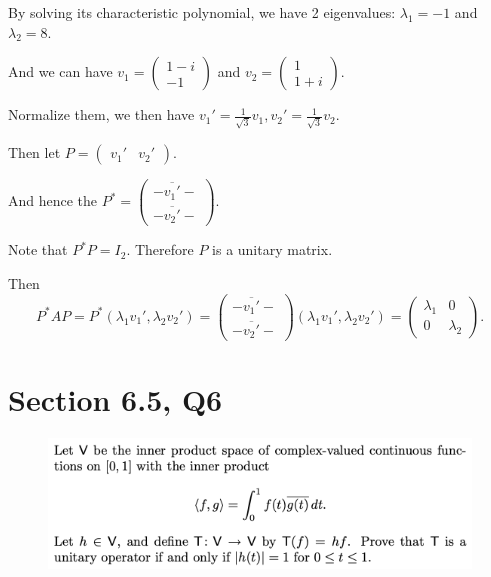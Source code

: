 \documentclass[12pt]{article}%
\begin{document}
By solving its characteristic polynomial, we have 2 eigenvalues: $\lambda_1=-1$ and $\lambda_2=8.$

And we can have $v_1=\begin{pmatrix} 1-i\\-1 \end{pmatrix}$ and 
$v_2=\begin{pmatrix} 1\\1+i \end{pmatrix}.$

Normalize them, we then have $v_1'=\frac{1}{\sqrt{3}}v_1,v_2'=\frac{1}{\sqrt{3}}v_2.$

Then let $P=\begin{pmatrix} v_1'& v_2' \end{pmatrix}.$ 

And hence the 
$P^*=\begin{pmatrix} -\overline{v_1'}-\\-\overline{v_2'}-  \end{pmatrix}.$

Note that $P^*P=I_2.$ Therefore $P$ is a unitary matrix.

Then $$P^*AP=P^*(\lambda_1 v_1', \lambda_2 v_2')=
\begin{pmatrix} -\overline{v_1'}-\\-\overline{v_2'}-  \end{pmatrix}(\lambda_1 v_1', \lambda_2 v_2')
=\begin{pmatrix} \lambda_1&0\\0&\lambda_2 \end{pmatrix}.$$


\newpage

\section{Section 6.5, Q6}
\begin{figure}[htp]
    \centering %
    \includegraphics[width = 16cm]{img/Q9.png}
\end{figure}
\end{document}
